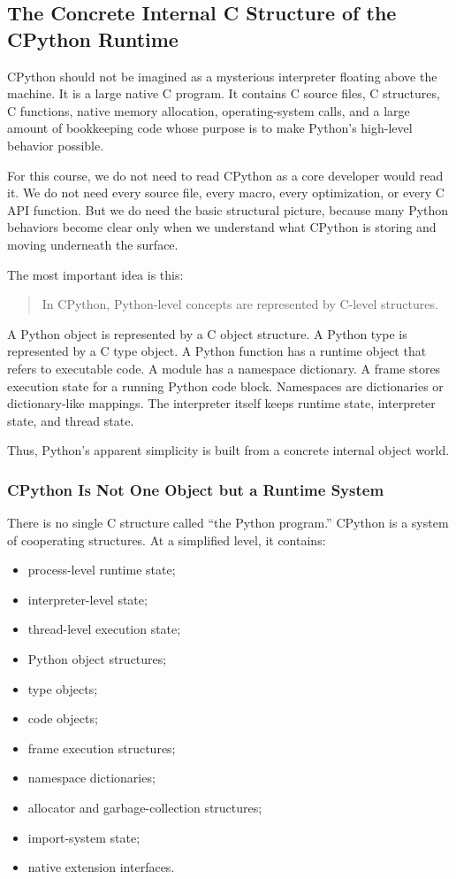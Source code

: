 \subsection{The Concrete Internal C Structure of the CPython Runtime}

CPython should not be imagined as a mysterious interpreter floating above the machine. It is a large native C program. It contains C source files, C structures, C functions, native memory allocation, operating-system calls, and a large amount of bookkeeping code whose purpose is to make Python's high-level behavior possible.

For this course, we do not need to read CPython as a core developer would read it. We do not need every source file, every macro, every optimization, or every C API function. But we do need the basic structural picture, because many Python behaviors become clear only when we understand what CPython is storing and moving underneath the surface.

The most important idea is this:

\begin{quote}
In CPython, Python-level concepts are represented by C-level structures.
\end{quote}

A Python object is represented by a C object structure. A Python type is represented by a C type object. A Python function has a runtime object that refers to executable code. A module has a namespace dictionary. A frame stores execution state for a running Python code block. Namespaces are dictionaries or dictionary-like mappings. The interpreter itself keeps runtime state, interpreter state, and thread state.

Thus, Python's apparent simplicity is built from a concrete internal object world.

\subsubsection{CPython Is Not One Object but a Runtime System}

There is no single C structure called ``the Python program.'' CPython is a system of cooperating structures. At a simplified level, it contains:

\begin{itemize}
    \item process-level runtime state;
    \item interpreter-level state;
    \item thread-level execution state;
    \item Python object structures;
    \item type objects;
    \item code objects;
    \item frame execution structures;
    \item namespace dictionaries;
    \item allocator and garbage-collection structures;
    \item import-system state;
    \item native extension interfaces.
\end{itemize}

